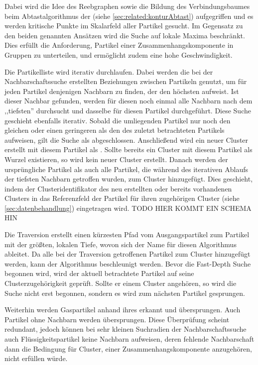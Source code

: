 Dabei wird die Idee des Reebgraphen sowie die Bildung des Verbindungsbaumes beim Abtastalgorithmus der  (siehe \autoref{sec:related:konturAbtast}) aufgegriffen und es werden kritische Punkte im Skalarfeld aller Partikel gesucht. Im Gegensatz zu den beiden genannten Ansätzen wird die Suche auf lokale Maxima beschränkt. Dies erfüllt die Anforderung, Partikel einer Zusammenhangskomponente in Gruppen zu unterteilen, und ermöglicht zudem eine hohe Geschwindigkeit.

Die Partikelliste wird iterativ durchlaufen. Dabei werden die bei der Nachbarschaftssuche erstellten Beziehungen zwischen Partikeln genutzt, um für jeden Partikel denjenigen Nachbarn zu finden, der den höchsten  aufweist. Ist dieser Nachbar gefunden, werden für diesen noch einmal alle Nachbarn nach dem ,,tiefsten'' durchsucht und dasselbe für diesen Partikel durchgeführt. Diese Suche geschieht ebenfalls iterativ. Sobald die umliegenden Partikel nur noch den gleichen oder einen geringeren  als den des zuletzt betrachteten Partikels aufweisen, gilt die Suche als abgeschlossen. Anschließend wird ein neuer Cluster erstellt mit diesem Partikel als . Sollte bereits ein Cluster mit diesem Partikel als Wurzel existieren, so wird kein neuer Cluster erstellt. Danach werden der ursprüngliche Partikel als auch alle Partikel, die während des iterativen Ablaufs der tiefsten Nachbarn getroffen wurden, zum Cluster hinzugefügt. Dies geschieht, indem der Clusteridentifikator des neu erstellten oder bereits vorhandenen Clusters in das Referenzfeld der Partikel für ihren zugehörigen Cluster (siehe \autoref{sec:datenbehandlung}) eingetragen wird. TODO HIER KOMMT EIN SCHEMA HIN %

Die Traversion erstellt einen kürzesten Pfad vom Ausgangspartikel zum Partikel mit der größten, lokalen Tiefe, wovon sich der Name für diesen Algorithmus ableitet. Da alle bei der Traversion getroffenen Partikel zum Cluster hinzugefügt werden, kann der Algorithmus beschleunigt werden. Bevor die Fast-Depth Suche begonnen wird, wird der aktuell betrachtete Partikel auf seine Clusterzugehörigkeit geprüft. Sollte er einem Cluster angehören, so wird die Suche nicht erst begonnen, sondern es wird zum nächsten Partikel gesprungen.

Weiterhin werden Gaspartikel anhand ihres  erkannt und übersprungen. Auch Partikel ohne Nachbarn werden übersprungen. Diese Überprüfung scheint redundant, jedoch können bei sehr kleinen Suchradien der Nachbarschaftssuche auch Flüssigkeitspartikel keine Nachbarn aufweisen, deren fehlende Nachbarschaft dann die Bedingung für Cluster, einer Zusammenhangskomponente anzugehören, nicht erfüllen würde.

